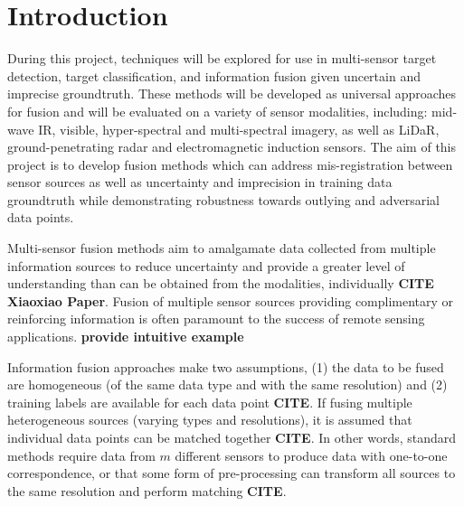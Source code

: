 \chapter{Introduction}

During this project, techniques will be explored for use in multi-sensor target detection, target classification, and information fusion given uncertain and imprecise groundtruth.  These methods will be developed as universal approaches for fusion and will be evaluated on a variety of sensor modalities, including: mid-wave IR, visible, hyper-spectral and multi-spectral imagery, as well as LiDaR, ground-penetrating radar and electromagnetic induction sensors.  The aim of this project is to develop fusion methods which can address mis-registration between sensor sources as well as uncertainty and imprecision in training data groundtruth while demonstrating robustness towards outlying and adversarial data points. \newline

Multi-sensor fusion methods aim to amalgamate data collected from multiple information sources to reduce uncertainty and provide a greater level of understanding than can be obtained from the modalities, individually \textbf{CITE Xiaoxiao Paper}.  Fusion of multiple sensor sources providing complimentary or reinforcing information is often paramount to the success of remote sensing applications.  \textbf{provide intuitive example} 

Information fusion approaches make two assumptions, (1) the data to be fused are homogeneous (of the same data type and with the same resolution) and (2) training labels are available for each data point \textbf{CITE}.  If fusing multiple heterogeneous sources (varying types and resolutions), it is assumed that individual data points can be matched together \textbf{CITE}.  In other words, standard methods require data from $m$ different sensors to produce data with one-to-one correspondence, or that some form of pre-processing can transform all sources to the same resolution and perform matching \textbf{CITE}.

